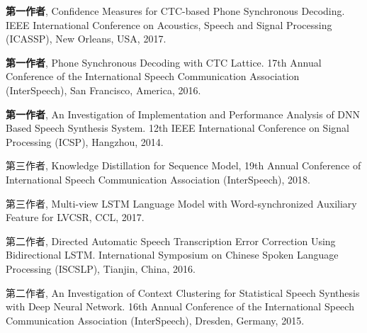 \begin{publications}{99}
 \item {\bf 第一作者}, Confidence Measures for CTC-based Phone Synchronous Decoding. IEEE International Conference on Acoustics, Speech and Signal Processing (ICASSP), New Orleans, USA, 2017.
 \item {\bf 第一作者}, Phone Synchronous Decoding with CTC Lattice. 17th Annual Conference of the International Speech Communication Association (InterSpeech), San Francisco, America, 2016.
 \item {\bf 第一作者}, An Investigation of Implementation and Performance Analysis of DNN Based Speech Synthesis System. 12th IEEE International Conference on Signal Processing (ICSP), Hangzhou, 2014.
 \\
 \item 第三作者, Knowledge Distillation for Sequence Model, 19th Annual Conference of  International Speech Communication Association (InterSpeech), 2018.
 \item 第三作者, Multi-view LSTM Language Model with Word-synchronized Auxiliary Feature for LVCSR, CCL, 2017.
 \item 第二作者, Directed Automatic Speech Transcription Error Correction Using Bidirectional LSTM. International Symposium on Chinese Spoken Language Processing (ISCSLP), Tianjin, China, 2016.
 \item 第二作者, An Investigation of Context Clustering for Statistical Speech Synthesis with Deep Neural Network. 16th Annual Conference of the International Speech Communication Association (InterSpeech), Dresden, Germany, 2015.
\end{publications}
